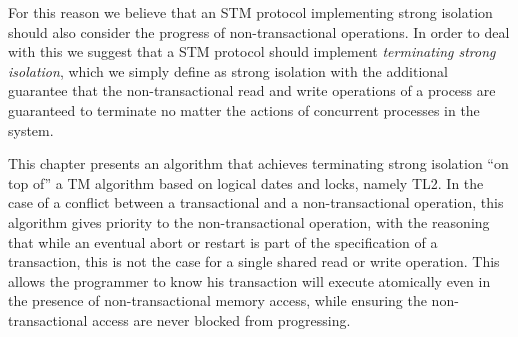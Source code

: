 For this reason we believe that an STM protocol implementing strong
isolation should also consider the progress of non-transactional operations.
In order to deal with this we suggest that a STM protocol should implement
\emph{terminating strong isolation}, which we simply define as strong isolation
with the additional guarantee that the non-transactional read and write
operations of a process are guaranteed to terminate no matter the actions of
concurrent processes in the system.







This chapter presents an algorithm that achieves terminating strong 
isolation  ``on top of'' a TM algorithm based on logical dates and locks, 
namely  TL2. 
In the case of a conflict between a transactional and a non-transactional
operation, this algorithm gives priority to 
the non-transactional operation, 
with the reasoning that while an eventual abort or restart is part of the 
specification of a transaction,
this is not the case for a single shared read or write operation. 
This allows the programmer to know his transaction will execute atomically even
in the presence of non-transactional memory access, while ensuring the non-transactional
access are never blocked from progressing.

